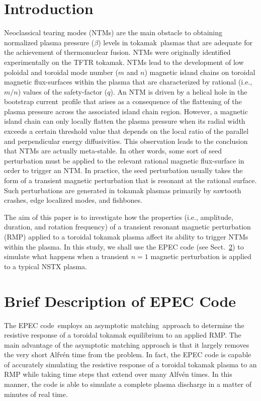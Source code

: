 \documentclass[12pt,prb,aps]{revtex4-1}
\begin{document}
\section{Introduction}
Neoclassical tearing modes (NTMs) are the main obstacle to obtaining
normalized plasma pressure ($\beta$) levels in tokamak\,\cite{wesson} plasmas that are adequate for  the achievement of 
thermonuclear fusion.\cite{buttery,lahaye} NTMs were originally identified experimentally on the TFTR tokamak.\cite{tftr} NTMs lead to the development of low poloidal and toroidal mode number ($m$ and $n$) magnetic island chains on toroidal magnetic flux-surfaces within the plasma that are characterized by rational (i.e., $m/n$) values of the safety-factor ($q$). An NTM is driven by a helical hole in the bootstrap current\,\cite{boot} profile  that arises as a consequence of the flattening of the
plasma pressure across the associated island chain region.\cite{carrera} However, a magnetic island chain can only locally flatten
the plasma pressure  when its radial width exceeds a certain threshold value that depends on the local ratio of the
parallel and perpendicular energy diffusivities.\cite{fitz} This observation leads to the conclusion that NTMs are actually meta-stable.
In other words, some sort of seed perturbation must be applied to the relevant rational magnetic flux-surface in order to trigger an NTM. In practice, the seed perturbation usually takes the form of a transient magnetic perturbation that is resonant at the
rational surface. Such perturbations are generated in tokamak plasmas primarily by sawtooth crashes, edge localized modes, and fishbones.\cite{buttery,lahaye} 

The aim of this paper is to investigate how the properties (i.e., amplitude, duration, and rotation frequency) of a transient resonant
magnetic perturbation (RMP) applied to a toroidal tokamak plasma affect its ability to trigger NTMs within the plasma. In this
study, we shall use the EPEC code (see Sect.~\ref{epecc}) to simulate what happens when a transient  $n=1$  magnetic
perturbation  is applied to a typical NSTX plasma. 

\section{Brief Description of EPEC Code}\label{epecc}
The EPEC code\,\cite{rftor,rftor1,rftor2,rftor3} employs an asymptotic matching\,\cite{fkr,coppi,ruth,ara,tt1,tt2,tt3,tt4,tt5,tt6,tt7} approach to determine the resistive response of a toroidal tokamak equilibrium to an applied RMP.
The main advantage of the asymptotic matching approach is that it largely removes the very short Alfv\'{e}n time from the problem. In fact, the EPEC
code is capable of accurately simulating the resistive response of a toroidal tokamak plasma to an RMP while taking time steps that extend over many Alfv\'{e}n times. 
In this manner, the code is able to simulate a complete plasma discharge in a matter of minutes of real time. 
\end{document}
